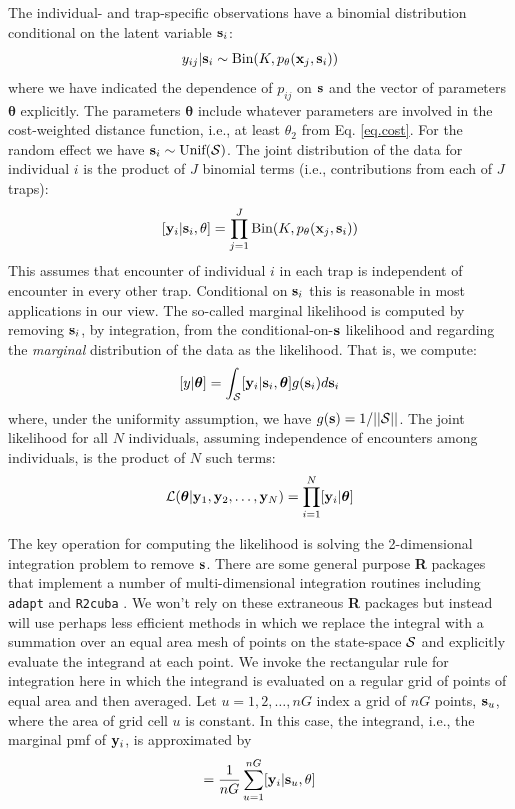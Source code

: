 \documentclass[12pt]{article}
\begin{document}
The individual- and trap-specific observations have a binomial
distribution conditional on the latent variable ${\bf s}_{i}$:
\begin{equation}
	y_{ij}| {\bf s}_{i} \sim \mbox{Bin}(K, p_{\theta}({\bf x}_{j},{\bf s}_{i}))
\label{mle.eq.cond-on-s}
\end{equation}
where we have indicated the dependence of $p_{ij}$ on ${\bf s}$ and
the vector of parameters ${\bm \theta}$ explicitly. The parameters
${\bm \theta}$ include whatever parameters are involved in the
cost-weighted distance function, i.e., at least $\theta_{2}$ from 
Eq. \ref{eq.cost}.
For the random effect we have ${\bf s}_{i} \sim  \mbox{Unif}({\cal
  S})$.
The joint distribution of the data for individual $i$ is the product
of $J$ binomial terms (i.e., contributions from each of $J$ traps):
\[
  [{\bf y}_{i} | {\bf s}_{i} , \theta] = 
  \prod_{j=1}^{J} \mbox{Bin}(K, p_{\theta}({\bf x}_{j},{\bf s}_{i}) )
\]
This assumes that encounter of individual $i$ in each
trap is independent of encounter in every other trap. Conditional on
${\bf s}_{i}$ this is reasonable in most applications in our view.
 The so-called marginal likelihood is computed by removing
${\bf s}_{i}$, by integration,  from the conditional-on-${\bf s}$
likelihood and regarding the {\it marginal} distribution of the data
as the likelihood. That
is, we compute:
\[
  [y|{\bm \theta}] = 
\int_{{\cal S}}  [ {\bf y}_{i} |{\bf s}_{i},{\bm \theta}] g({\bf s}_{i}) d{\bf s}_{i}
\]
where, under the uniformity assumption, we have
$g({\bf s}) = 1/||{\cal S}||$.
The joint likelihood for all $N$ individuals, assuming independence of
encounters among individuals, is the product of $N$ such terms:
\[
{\cal L}({\bm \theta} | {\bf y}_{1},{\bf y}_{2},\ldots, {\bf y}_{N}) = \prod_{i=1}^{N}
[{\bf y}_{i}|{\bm \theta}]
\]

The key operation for computing the likelihood is solving the
2-dimensional integration problem to remove ${\bf s}$. There are some
general purpose {\bf R} packages that implement a number of
multi-dimensional integration routines including \mbox{\tt adapt}
\citep{genz_etal:2007} and \mbox{\tt R2cuba} \citep{hahn_etal:2011}.
We won't rely on these extraneous {\bf R} packages but instead will
use perhaps less efficient methods in which we replace the integral
with a summation over an equal area mesh of points on the state-space
${\cal S}$ and explicitly evaluate the integrand at each point. We
invoke the rectangular rule for integration here in which the
integrand is evaluated on a regular grid of points of equal area and
then averaged.  Let $u=1,2,\ldots,nG$ index a grid of $nG$ points,
${\bf s}_{u}$, where the area of grid cell $u$ is constant.  In this
case, the integrand, i.e., the marginal pmf of ${\bf y}_{i}$, is
approximated by
\begin{equation}
         [{\bf y}_{i}|\theta] = \frac{1}{nG} \sum_{u=1}^{nG}  [ {\bf
            y}_{i} |{\bf s}_u, \theta]
\label{mle.eq.intlik}
\end{equation}
\end{document}
